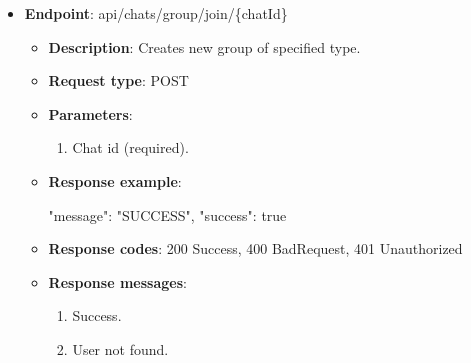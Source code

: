 \begin{itemize}
    \item \textbf{Endpoint}: api/chats/group/join/\{chatId\}
    \begin{itemize}
        \item \textbf{Description}: Creates new group of specified type.
        \item \textbf{Request type}: POST
        \item \textbf{Parameters}:
        \begin{enumerate}
            \item Chat id (required).
        \end{enumerate}
        \item \textbf{Response example}:
        \begin{spverbatim}
        {
            "message": "SUCCESS",
            "success": true
        }
        \end{spverbatim}
        \item \textbf{Response codes}: 200 Success, 400 BadRequest, 401 Unauthorized
        \item \textbf{Response messages}:
        \begin{enumerate}
            \item Success.
            \item User not found.
        \end{enumerate}
    \end{itemize}
\end{itemize}

